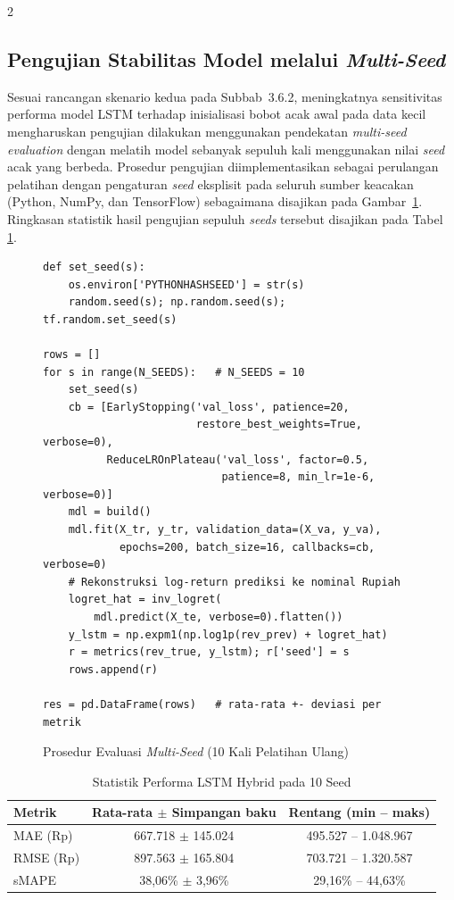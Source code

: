 \documentclass[12pt, a4paper, onecolumn, oneside]{report}
\begin{document}
\begin{spacing}{2}
\subsection{Pengujian Stabilitas Model melalui \textit{Multi-Seed}}

Sesuai rancangan skenario kedua pada Subbab~3.6.2, meningkatnya sensitivitas performa model LSTM terhadap inisialisasi bobot acak awal pada data kecil mengharuskan pengujian dilakukan menggunakan pendekatan \textit{multi-seed evaluation} dengan melatih model sebanyak sepuluh kali menggunakan nilai \textit{seed} acak yang berbeda. Prosedur pengujian diimplementasikan sebagai perulangan pelatihan dengan pengaturan \textit{seed} eksplisit pada seluruh sumber keacakan (Python, NumPy, dan TensorFlow) sebagaimana disajikan pada Gambar~\ref{fig:multiseed}. Ringkasan statistik hasil pengujian sepuluh \textit{seeds} tersebut disajikan pada Tabel \ref{tab:statistik_multiseed}.

\begin{figure}[H]
\begin{lstlisting}
def set_seed(s):
    os.environ['PYTHONHASHSEED'] = str(s)
    random.seed(s); np.random.seed(s); tf.random.set_seed(s)

rows = []
for s in range(N_SEEDS):   # N_SEEDS = 10
    set_seed(s)
    cb = [EarlyStopping('val_loss', patience=20,
                        restore_best_weights=True, verbose=0),
          ReduceLROnPlateau('val_loss', factor=0.5,
                            patience=8, min_lr=1e-6, verbose=0)]
    mdl = build()
    mdl.fit(X_tr, y_tr, validation_data=(X_va, y_va),
            epochs=200, batch_size=16, callbacks=cb, verbose=0)
    # Rekonstruksi log-return prediksi ke nominal Rupiah
    logret_hat = inv_logret(
        mdl.predict(X_te, verbose=0).flatten())
    y_lstm = np.expm1(np.log1p(rev_prev) + logret_hat)
    r = metrics(rev_true, y_lstm); r['seed'] = s
    rows.append(r)

res = pd.DataFrame(rows)   # rata-rata +- deviasi per metrik
\end{lstlisting}
\caption{Prosedur Evaluasi \textit{Multi-Seed} (10 Kali Pelatihan Ulang)}
\label{fig:multiseed}
\end{figure}

\begin{table}[H]
\centering
\caption{Statistik Performa LSTM Hybrid pada 10 Seed}
\label{tab:statistik_multiseed}
\begin{tabular}{|l|c|c|}
\hline
\textbf{Metrik} & \textbf{Rata-rata $\pm$ Simpangan baku} & \textbf{Rentang (min -- maks)} \\ \hline
MAE (Rp) & 667.718 $\pm$ 145.024 & 495.527 -- 1.048.967 \\ \hline
RMSE (Rp) & 897.563 $\pm$ 165.804 & 703.721 -- 1.320.587 \\ \hline
sMAPE & 38,06\% $\pm$ 3,96\% & 29,16\% -- 44,63\% \\ \hline
\end{tabular}
\end{table}


\end{spacing}
\end{document}
